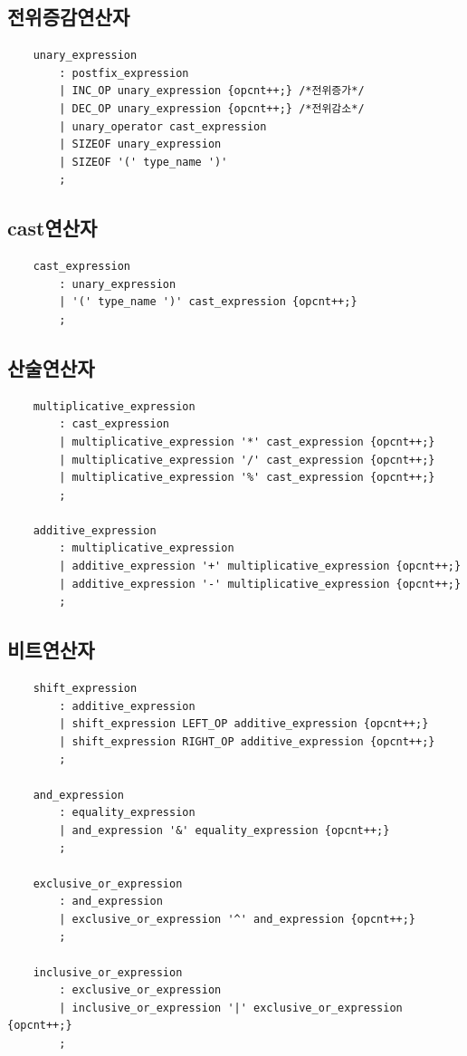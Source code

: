 \documentclass{oblivoir}
\begin{document}
\subsection{전위증감연산자}
\begin{verbatim}
    unary_expression
        : postfix_expression
        | INC_OP unary_expression {opcnt++;} /*전위증가*/
        | DEC_OP unary_expression {opcnt++;} /*전위감소*/
        | unary_operator cast_expression
        | SIZEOF unary_expression
        | SIZEOF '(' type_name ')'
        ;
\end{verbatim}
\subsection{cast연산자}
\begin{verbatim}
    cast_expression
        : unary_expression
        | '(' type_name ')' cast_expression {opcnt++;} 
        ;
\end{verbatim}
\subsection{산술연산자}
\begin{verbatim}
    multiplicative_expression
        : cast_expression
        | multiplicative_expression '*' cast_expression {opcnt++;}
        | multiplicative_expression '/' cast_expression {opcnt++;}
        | multiplicative_expression '%' cast_expression {opcnt++;}
        ;

    additive_expression
        : multiplicative_expression
        | additive_expression '+' multiplicative_expression {opcnt++;}
        | additive_expression '-' multiplicative_expression {opcnt++;}
        ;
\end{verbatim}
\subsection{비트연산자}
\begin{verbatim}
    shift_expression
        : additive_expression
        | shift_expression LEFT_OP additive_expression {opcnt++;}
        | shift_expression RIGHT_OP additive_expression {opcnt++;}
        ; 
        
    and_expression
        : equality_expression
        | and_expression '&' equality_expression {opcnt++;}
        ;

    exclusive_or_expression
        : and_expression
        | exclusive_or_expression '^' and_expression {opcnt++;}
        ;

    inclusive_or_expression
        : exclusive_or_expression
        | inclusive_or_expression '|' exclusive_or_expression {opcnt++;}
        ;
\end{verbatim}
\end{document}
